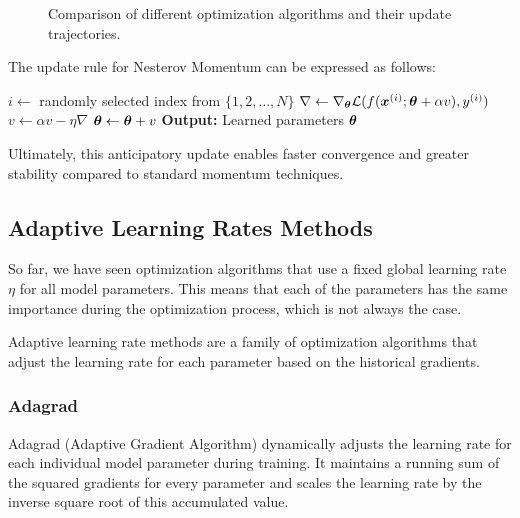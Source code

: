 \begin{figure}[H]
    \centering
    \scalebox{0.7}{}
    \caption{Comparison of different optimization algorithms and their update trajectories.}
\end{figure}

The update rule for Nesterov Momentum can be expressed as follows:

\begin{algorithm}[H]
    \caption{Stochastic Gradient Descent with Nesterov Momentum}
    \begin{algorithmic}[1]
            \State $i \leftarrow$ randomly selected index from $\{1, 2, \ldots, N\}$
            \State $\nabla \leftarrow \nabla_{\boldsymbol{\theta}} \mathcal{L}(f(\boldsymbol{x}^{(i)}; \boldsymbol{\theta} + \alpha v), y^{(i)})$
            \State $v \leftarrow \alpha v - \eta \nabla$
            \State $\boldsymbol{\theta} \leftarrow \boldsymbol{\theta} + v$
        \EndWhile
        \State \textbf{Output:} Learned parameters $\boldsymbol{\theta}$
    \end{algorithmic}
\end{algorithm}
Ultimately, this anticipatory update enables faster convergence and greater stability compared to standard momentum techniques.

\subsection{Adaptive Learning Rates Methods}
So far, we have seen optimization algorithms that use a fixed global learning rate $\eta$ for all model parameters. 
This means that each of the parameters has the same importance during the optimization process, which is not always the case.

Adaptive learning rate methods are a family of optimization algorithms that adjust the learning rate for each parameter based on the historical gradients.

\subsubsection{Adagrad}
Adagrad (Adaptive Gradient Algorithm) dynamically adjusts the learning rate for each individual model parameter during training. 
It maintains a running sum of the squared gradients for every parameter and scales the learning rate by the inverse square root of this accumulated value. 

